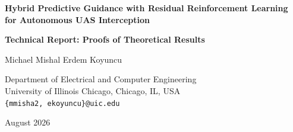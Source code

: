 \documentclass[10pt]{article}
\begin{document}
\begin{center}

{\LARGE\bfseries
Hybrid Predictive Guidance with Residual Reinforcement Learning\\
for Autonomous UAS Interception
\par}

\vspace{0.6em}

{\large\bfseries
Technical Report: Proofs of Theoretical Results
\par}

\vspace{1em}

{\large
Michael Mishal \qquad Erdem Koyuncu
\par}

\vspace{0.25em}

{\normalsize
Department of Electrical and Computer Engineering\\
University of Illinois Chicago, Chicago, IL, USA\\
\texttt{\{mmisha2, ekoyuncu\}@uic.edu}
\par}

\vspace{0.6em}

{\small August 2026}

\end{center}

\vspace{0.6em}

\begin{abstract}
This technical report supplements the paper
\emph{Hybrid Predictive Guidance with Residual Reinforcement Learning for
Autonomous UAS Interception}. It provides detailed proofs of the geometric
properties of the proposed Lead-Residual Proximal Policy Optimization
(LR-PPO) guidance law. Specifically, the results establish orthogonality and
norm bounds for the projected residual, an explicit bound on angular
deviation from predictive Lead guidance, exact recovery of the nominal Lead
direction for residuals with no orthogonal component, and a positive lower
bound on alignment between the executed LR-PPO and Lead commands. These
properties constrain the authority of the learned correction but do not imply
closed-loop stability or global interception optimality.
\end{abstract}


\end{document}
